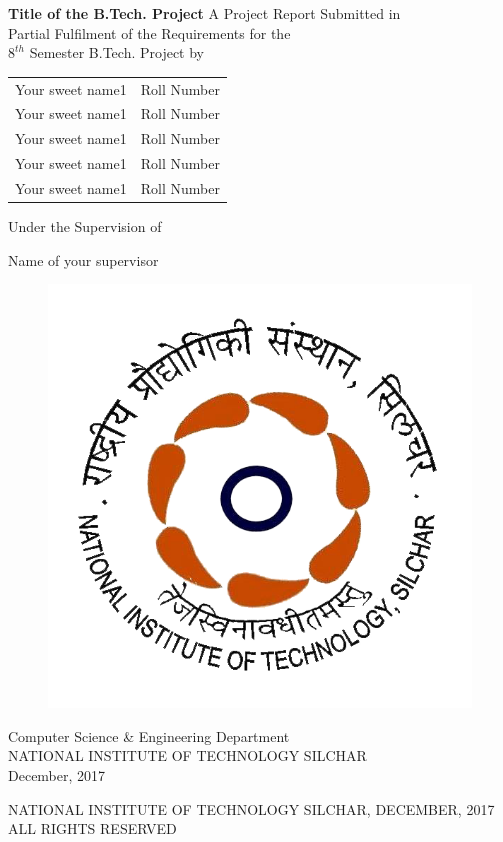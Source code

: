 

\thispagestyle{empty}
\begin{center}
\Large\textbf{Title of the B.Tech. Project}
\vfill
\large{A Project Report Submitted in\\
Partial Fulfilment of the Requirements for the \\
$8^{th}$ Semester B.Tech. Project }
\vfill
by

\begin{table}[h]
\centering
\begin{tabular}{cc}
Your sweet name1 & Roll Number\\
Your sweet name1 & Roll Number\\
Your sweet name1 & Roll Number\\
Your sweet name1 & Roll Number\\
Your sweet name1 & Roll Number\\
\end{tabular}
\end{table}

\vfill
\large{Under the Supervision of 

Name of your supervisor}
\begin{figure}[htpb]
\centering
\includegraphics{Frontmatter/nit}
\end{figure}

\large{Computer Science \& Engineering Department}\\
\large{\MakeUppercase{National Institute of Technology Silchar}}\\
\large{December, 2017}
\end{center}
\newpage
\thispagestyle{empty}
\begin{center}
\small{\textcopyright\MakeUppercase{ National institute of technology Silchar, December, 2017}}\\
\small{\MakeUppercase{All rights reserved}}
\end{center}
